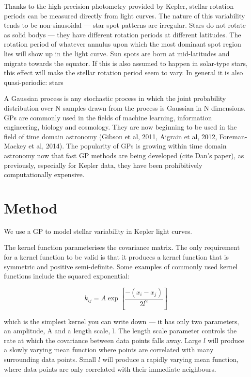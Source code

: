 \documentclass[12pt,preprint]{aastex}
\begin{document}
Thanks to the high-precision photometry provided by Kepler, stellar rotation periods can be measured directly from light curves.
The nature of this variability tends to be non-sinusoidal --- star spot patterns are irregular.
Stars do not rotate as solid bodys --- they have different rotation periods at different latitudes.
The rotation period of whatever annulus upon which the most dominant spot region lies will show up in the light curve.
Sun spots are born at mid-latitudes and migrate towards the equator.
If this is also assumed to happen in solar-type stars, this effect will make the stellar rotation period seem to vary.
In general it is also quasi-periodic: stars

A Gaussian process is any stochastic process in which the joint probability distribution over N samples drawn from the process is Gaussian in N dimensions.
GPs are commonly used in the fields of machine learning, information engineering, biology and cosmology.
They are now beginning to be used in the field of time domain astronomy (Gibson et al, 2011, Aigrain et al, 2012, Foreman-Mackey et al, 2014).
The popularity of GPs is growing within time domain astronomy now that fast GP methods are being developed (cite Dan's paper), as previously, especially for Kepler data, they have been prohibitively computationally expensive.

\section{Method}

We use a GP to model stellar variability in Kepler light curves.

The kernel function parameterises the covariance matrix.
The only requirement for a kernel function to be valid is that it produces a kernel function that is symmetric and positive semi-definite.
Some examples of commonly used kernel functions include the squared exponential:

\begin{equation}
	k_{ij} = A\exp\left[{\frac{-(x_i-x_j)}{2l^2}}\right]
\end{equation}

which is the simplest kernel you can write down --- it has only two parameters, an amplitude, A and a length scale, l.
The length scale parameter controls the rate at which the covariance between data points falls away.
Large $l$ will produce a slowly varying mean function where points are correlated with many surrounding data points.
Small $l$ will produce a rapidly varying mean function, where data points are only correlated with their immediate neighbours.
\end{document}
